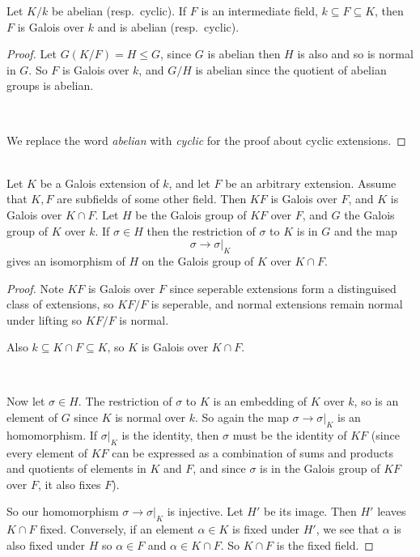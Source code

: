 \begin{corollary}
    Let $K/k$ be abelian (resp.~cyclic). If $F$ is an intermediate field, $k\subseteq F\subseteq K$, then $F$ is Galois over $k$ and is abelian (resp.~cyclic).
    \begin{proof}
        Let $G(K/F) = H\leq G$, since $G$ is abelian then $H$ is also and so is normal in $G$. So $F$ is Galois over $k$, and $G/H$ is abelian since the quotient of abelian groups is abelian.
        
        \

        We replace the word \textit{abelian} with \textit{cyclic} for the proof about cyclic extensions.
    \end{proof}
\end{corollary}

\begin{theorem}{}\label{1.12}\\
    Let $K$ be a Galois extension of $k$, and let $F$ be an arbitrary extension. Assume that $K,F$ are subfields of some other field. Then $KF$ is Galois over $F$, and $K$ is Galois over $K\cap F$. Let $H$ be the Galois group of $KF$ over $F$, and $G$ the Galois group of $K$ over $k$. If $\sigma\in H$ then the restriction of $\sigma$ to $K$ is in $G$ and the map\[
        \sigma\rightarrow \sigma|_K    
    \]
    gives an isomorphism  of $H$ on the Galois group of $K$ over $K\cap F$. 

    \begin{proof}
        Note $KF$ is Galois over $F$ since seperable extensions form a distinguised class of extensions, so $KF/F$ is seperable, and normal extensions remain normal under lifting so $KF/F$ is normal.
        
        Also $k\subseteq K\cap F\subseteq K$, so $K$ is Galois over $K\cap F$.

        \

        Now let $\sigma\in H$. The restriction of $\sigma$ to $K$ is an embedding of $K$ over $k$, so is an element of $G$ since $K$ is normal over $k$. So again the map $\sigma\rightarrow \sigma|_K$ is an homomorphism. If $\sigma|_K$  is the identity, then $\sigma$ must be the identity of $KF$
        (since every element of $KF$ can be expressed as a combination of sums and products and quotients of elements in $K$ and $F$, and since $\sigma$ is in the Galois group of $KF$ over $F$, it also fixes $F$).

        So our homomorphism $\sigma\rightarrow \sigma|_K$ is injective. Let $H'$ be its image. Then $H'$ leaves $K\cap F$ fixed. Conversely, if an element $\alpha\in K$ is fixed under $H'$, we see that $\alpha$ is also fixed under $H$ so $\alpha\in F$ and $\alpha\in K\cap F$. So $K\cap F$ is the fixed field. 


\end{proof}
\end{theorem}
